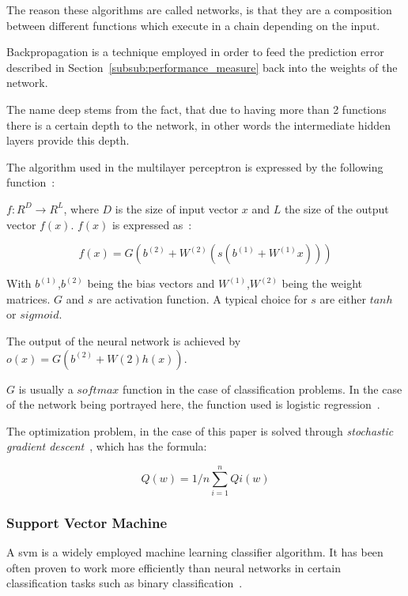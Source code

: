 \documentclass[12pt]{article}
\begin{document}
The reason these algorithms are called networks, is that they are a composition between different functions which execute in a chain depending on the input. 

Backpropagation is a technique employed in order to feed the prediction error described in Section~\ref{subsub:performance_measure} back into the weights of the network. 

The name deep stems from the fact, that due to having more than 2 functions there is a certain depth to the network, in other words the intermediate hidden layers provide this depth.

The algorithm used in the multilayer perceptron is expressed by the following function~\citep{theanoTutorial}:

$f: R^D \rightarrow R^L$, where $D$ is the size of input vector $x$ and $L$ the size of the output vector $f(x)$. $f(x)$ is expressed as~\citep{theanoTutorial}:

\begin{equation}
    f(x) = G(b^{(2)} + W^{(2)}(s(b^{(1)}+W^{(1)}x)))
\end{equation}

With $b^{(1)}$,$b^{(2)}$ being the bias vectors and $W^{(1)}$,$W^{(2)}$ being the weight matrices. $G$ and $s$ are activation function. A typical choice for $s$ are either $tanh$ or $sigmoid$.

The output of the neural network is achieved by $o(x) = G(b^{(2)} + W{(2)}h(x))$. 

$G$ is usually a $softmax$ function in the case of classification problems. In the case of the network being portrayed here, the function used is logistic regression~\citep{theanoTutorial}.

The optimization problem, in the case of this paper is solved through \emph{stochastic gradient descent}~\citep{theanoTutorial}, which has the formula:

\begin{equation}
    Q(w) = 1/n\sum_{i=1}^{n}Qi(w)
\end{equation}

\subsubsection{Support Vector Machine}
\label{subsub:svm}
A \gls{svm} is a widely employed machine learning classifier algorithm. It has been often proven to work more efficiently than neural networks in certain classification tasks such as binary classification~\citep{up, 04443437.pdf}. 
\end{document}
